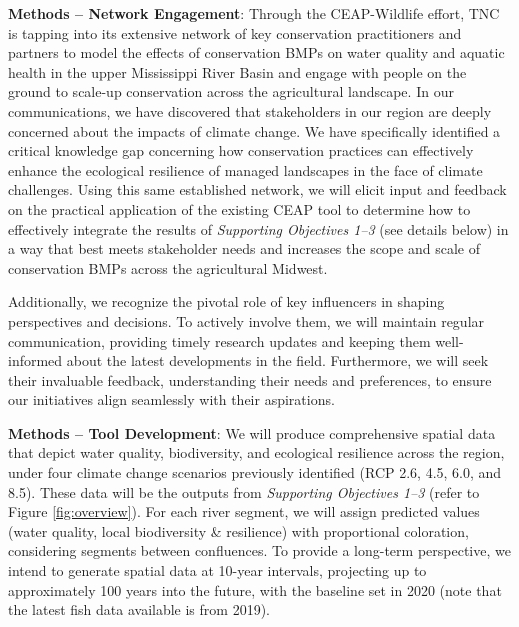 \documentclass[12pt, class=article, crop=false]{standalone}
\begin{document}
\textbf{Methods -- Network Engagement}: Through the CEAP-Wildlife effort, TNC is tapping into its extensive network of key conservation practitioners and partners to model the effects of conservation BMPs on water quality and aquatic health in the upper Mississippi River Basin and engage with people on the ground to scale-up conservation across the agricultural landscape.
In our communications, we have discovered that stakeholders in our region are deeply concerned about the impacts of climate change.
We have specifically identified a critical knowledge gap concerning how conservation practices can effectively enhance the ecological resilience of managed landscapes in the face of climate challenges.
Using this same established network, we will elicit input and feedback on the practical application of the existing CEAP tool to determine how to effectively integrate the results of \textit{Supporting Objectives 1--3} (see details below) in a way that best meets stakeholder needs and increases the scope and scale of conservation BMPs across the agricultural Midwest. 

Additionally, we recognize the pivotal role of key influencers in shaping perspectives and decisions.
To actively involve them, we will maintain regular communication, providing timely research updates and keeping them well-informed about the latest developments in the field.
Furthermore, we will seek their invaluable feedback, understanding their needs and preferences, to ensure our initiatives align seamlessly with their aspirations.

\textbf{Methods -- Tool Development}: We will produce comprehensive spatial data that depict water quality, biodiversity, and ecological resilience across the region, under four climate change scenarios previously identified (RCP 2.6, 4.5, 6.0, and 8.5).
These data will be the outputs from \textit{Supporting Objectives 1--3} (refer to Figure \ref{fig:overview}).
For each river segment, we will assign predicted values (water quality, local biodiversity \& resilience) with proportional coloration, considering segments between confluences.
To provide a long-term perspective, we intend to generate spatial data at 10-year intervals, projecting up to approximately 100 years into the future, with the baseline set in 2020 (note that the latest fish data available is from 2019).
\end{document}
